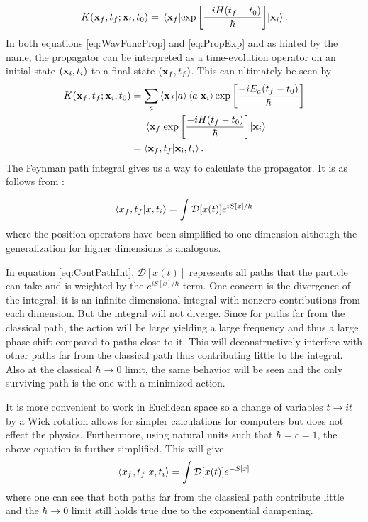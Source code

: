 \documentclass[11pt]{article}
\begin{document}
\begin{align}
	K(\vb{x}_f,t_f;\vb{x}_i,t_0)=\mel{\vb{x}_f}{\exp\left[\frac{-iH(t_f-t_0)}{\hbar}\right]}{\vb{x}_i}.
	\label{eq:PropExp}
\end{align}
In both equations \ref{eq:WavFuncProp} and \ref{eq:PropExp} and as hinted by the name, the propagator can be interpreted as a time-evolution operator on an initial state $(\vb{x}_i,t_i)$ to a final state $(\vb{x}_f,t_f)$. This can ultimately be seen by
\begin{align}
\begin{split}
	K(\vb{x}_f,t_f;\vb{x}_i,t_0)&=\sum_a\bra{\vb{x}_f}\ket{a}\bra{a}\ket{\vb{x}_i}\exp\left[\frac{-iE_a(t_f-t_0)}{\hbar}\right]\\
	&=\mel{\vb{x}_f}{\exp\left[\frac{-iH(t_f-t_0)}{\hbar}\right]}{\vb{x}_i}\\
	&=\bra{\vb{x}_f,t_f}\ket{\vb{x_i},t_i}.
\end{split}
\end{align}
The Feynman path integral gives us a way to calculate the propagator. It is as follows from \cite{MainPaper}:

\begin{align}
	\bra{x_f,t_f}\ket{x,t_i}=\int\mathcal{D}[x(t)]e^{iS[x]/\hbar}
	\label{eq:ContPathInt}
\end{align}
where the position operators have been simplified to one dimension although the generalization for higher dimensions is analogous.

In equation \ref{eq:ContPathInt}, $\mathcal{D}[x(t)]$ represents all paths that the particle can take and is weighted by the $e^{iS[x]/\hbar}$ term. One concern is the divergence of the integral; it is an infinite dimensional integral with nonzero contributions from each dimension. But the integral will not diverge. Since for paths far from the classical path, the action will be large yielding a large frequency and thus a large phase shift compared to paths close to it. This will deconstructively interfere with other paths far from the classical path thus contributing little to the integral. Also at the classical $\hbar\to0$ limit, the same behavior will be seen and the only surviving path is the one with a minimized action.

It is more convenient to work in Euclidean space so a change of variables $t\to it$ by a Wick rotation allows for simpler calculations for computers but does not effect the physics. Furthermore, using natural units such that $\hbar=c=1$, the above equation is further simplified. This will give
\begin{align}
	\bra{x_f,t_f}\ket{x,t_i}=\int\mathcal{D}[x(t)]e^{-S[x]}
\end{align}	
where one can see that both paths far from the classical path contribute little and the $\hbar\to0$ limit still holds true due to the exponential dampening.
\end{document}
